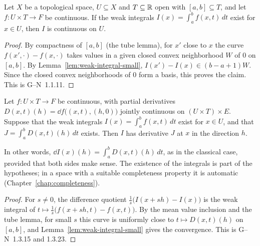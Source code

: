 \begin{proposition}[Continuity]
  \label{prop:param-continuity}
  \leanok
  Let $X$ be a topological space, $U \subseteq X$ and $T \subseteq \mathbb{R}$ open with
  $[a, b] \subseteq T$, and let $f \colon U \times T \to F$ be continuous. If the weak integrals
  $I(x) = \int_a^b f(x, t)\, dt$ exist for $x \in U$, then $I$ is continuous on $U$.
\end{proposition}

\begin{proof}
  \leanok
  By compactness of $[a, b]$ (the tube lemma), for $x'$ close to $x$ the curve
  $f(x', \cdot) - f(x, \cdot)$ takes values in a given closed convex neighborhood $W$ of $0$ on
  $[a, b]$. By Lemma~\ref{lem:weak-integral-small}, $I(x') - I(x) \in (b - a + 1)W$. Since
  the closed convex neighborhoods of $0$ form a basis, this proves the claim. This is
  G--N~1.1.11.
\end{proof}

\begin{theorem}
  \label{thm:diff-under-integral}
  \leanok
  Let $f \colon U \times T \to F$ be continuous, with partial derivatives
  $D(x,t)(h) = \dd f\bigl((x,t), (h, 0)\bigr)$ jointly continuous on $(U \times T) \times E$.
  Suppose that the weak integrals $I(x) = \int_a^b f(x, t)\, dt$ exist for $x \in U$, and that
  $J = \int_a^b D(x, t)(h)\, dt$ exists. Then $I$ has derivative $J$ at $x$ in the direction
  $h$.
\end{theorem}

In other words, $\dd I(x)(h) = \int_a^b D(x, t)(h)\, dt$, as in the classical case, provided
that both sides make sense. The existence of the integrals is part of the hypotheses; in a
space with a suitable completeness property it is automatic (Chapter~\ref{chap:completeness}).

\begin{proof}
  \leanok
  For $s \neq 0$, the difference quotient $\frac{1}{s}\bigl(I(x + sh) - I(x)\bigr)$ is the weak
  integral of $t \mapsto \frac{1}{s}\bigl(f(x + sh, t) - f(x, t)\bigr)$. By the mean value
  inclusion and the tube lemma, for small $s$ this curve is uniformly close to
  $t \mapsto D(x, t)(h)$ on $[a, b]$, and Lemma~\ref{lem:weak-integral-small} gives the
  convergence. This is G--N~1.3.15 and 1.3.23.
\end{proof}
